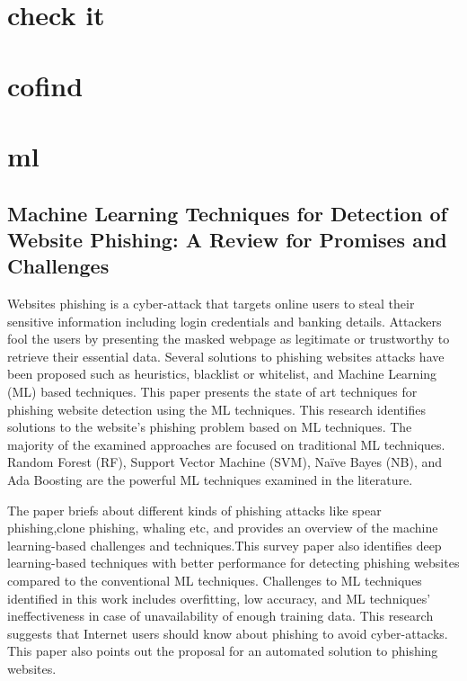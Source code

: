 \section{check it}

\section{cofind}

\section{ml}

\subsection{Machine Learning Techniques for Detection of Website Phishing: A Review for Promises and Challenges}

Websites phishing is a cyber-attack that targets online users to steal their sensitive information including login credentials and banking details. Attackers fool the users by presenting the masked webpage as legitimate or trustworthy to retrieve their essential data. Several solutions to phishing websites attacks have been proposed such as heuristics, blacklist or whitelist, and Machine Learning (ML) based techniques. This paper presents the state of art techniques for phishing website detection using the ML techniques. This research identifies solutions to the website's phishing problem based on ML techniques. The majority of the examined approaches are focused on traditional ML techniques. Random Forest (RF), Support Vector Machine (SVM), Naïve Bayes (NB), and Ada Boosting are the powerful ML techniques examined in the literature.

The paper briefs about different kinds of phishing attacks like spear phishing,clone phishing, whaling etc, and provides an overview of the machine learning-based challenges and techniques.This survey paper also identifies deep learning-based techniques with better performance for detecting phishing websites compared to the conventional ML techniques. Challenges to ML techniques identified in this work includes overfitting, low accuracy, and ML techniques' ineffectiveness in case of unavailability of enough training data. This research suggests that Internet users should know about phishing to avoid cyber-attacks. This paper also points out the proposal for an automated solution to phishing websites.

